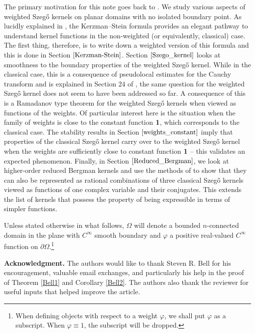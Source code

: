 \documentclass[11pt, reqno]{amsart}
\numberwithin{equation}{section}
\begin{document}
\medskip

The primary motivation for this note goes back to \cite{Be1}. We study various aspects of weighted Szeg\H{o} kernels on planar domains with no isolated boundary point. As lucidly explained in \cite{Be0}, the Kerzman--Stein formula provides an elegant pathway to understand kernel functions in the non-weighted (or equivalently, classical) case. The first thing, therefore, is to write down a weighted version of this formula and this is done in Section $\ref{Kerzman-Stein}$. Section $\ref{Szego_kernel}$ looks at smoothness to the boundary properties of the weighted Szeg\H{o} kernel. While in the classical case, this is a consequence of pseudolocal estimates for the Cauchy transform and is explained in Section $24$ of \cite{Be0}, the same question for the weighted Szeg\H{o} kernel does not seem to have been addressed so far.  A consequence of this is a Ramadanov type theorem for the weighted Szeg\H{o} kernels when viewed as functions of the weights. Of particular interest here is the situation when the family of weights is close to the constant function $\bf 1$, which corresponds to the classical case. The stability results in Section $\ref{weights_constant}$ imply that properties of the classical Szeg\H{o} kernel carry over to the weighted Szeg\H{o} kernel when the weights are sufficiently close to constant function $\bf 1$ -- this validates an expected phenomenon. Finally, in Section $\ref{Reduced_Bergman}$, we look at higher-order reduced Bergman kernels and use the methods of \cite{Be1} to show that they can also be represented as rational combinations of three classical Szeg\H{o} kernels viewed as functions of one complex variable and their conjugates. This extends the list of kernels that possess the property of being expressible in terms of simpler functions.

\medskip

Unless stated otherwise in what follows, $\Omega$ will denote a bounded $n$-connected domain in the plane with $C^{\infty}$ smooth boundary and $\varphi$ a positive real-valued $C^{\infty}$ function on $\partial\Omega$.\footnote{When defining objects with respect to a weight $\varphi$, we shall put $\varphi$ as a subscript. When $\varphi\equiv 1$, the subscript will be dropped.}

\medskip

\noindent\textbf{Acknowledgment.} The authors would like to thank Steven R. Bell for his encouragement, valuable email exchanges, and particularly his help in the proof of Theorem \ref{Bell1} and Corollary \ref{Bell2}. The authors also thank the reviewer for useful inputs that helped improve the article.
\end{document}
